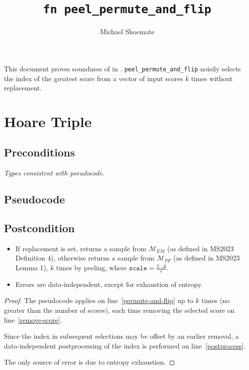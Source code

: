 \documentclass{article}
\title{\texttt{fn peel\_permute\_and\_flip}}
\author{Michael Shoemate}
\begin{document}
\maketitle\contrib
This document proves soundness of  in . 
\texttt{peel\_permute\_and\_flip} noisily selects the index of the greatest score from a vector of input scores $k$ times without replacement.

\section{Hoare Triple}
\subsection*{Preconditions}
\textit{Types consistent with pseudocode.}

\subsection*{Pseudocode}
\label{sec:python-pseudocode}


\subsection*{Postcondition}
\begin{theorem}
    \label{postcondition}

    \begin{itemize}
        \item If replacement is set, returns a sample from $\mathcal{M}_{EM}$ (as defined in MS2023 Definition 4),
            otherwise returns a sample from $\mathcal{M}_{PF}$ (as defined in MS2023 Lemma 1),
            $k$ times by peeling,
            where $\texttt{scale} = \frac{2 \cdot \Delta}{\epsilon}$.
        \item Errors are data-independent, except for exhaustion of entropy.
    \end{itemize}
\end{theorem}

\begin{proof}
    The pseudocode applies  on line~\ref{permute-and-flip}
    up to $k$ times (no greater than the number of scores),
    each time removing the selected score on line~\ref{remove-score}.

    Since the index in subsequent selections may be offset by an earlier removal,
    a data-independent postprocessing of the index is performed on line~\ref{postprocess}.

    The only source of error is due to entropy exhaustion.
\end{proof}
\end{document}
